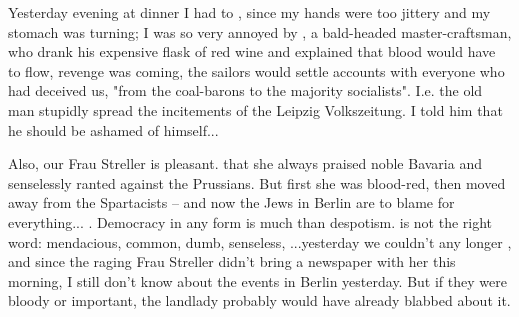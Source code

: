 
Yesterday evening at dinner I had to , since my hands were too jittery and my stomach was turning; I was so very annoyed by , a bald-headed master-craftsman, who drank his expensive flask of red wine and explained that blood would have to flow, revenge was coming, the sailors would settle accounts with everyone who had deceived us, "from the coal-barons to the majority socialists". I.e. the old man stupidly spread the incitements of the Leipzig Volkszeitung. I told him that he should be ashamed of himself...

Also, our Frau Streller is pleasant.  that she always praised noble Bavaria and senselessly ranted against the Prussians. But first she was blood-red, then moved away from the Spartacists -- and now the Jews in Berlin are to blame for everything... . Democracy in any form is much  than despotism.  is not the right word: mendacious, common, dumb, senseless, ...yesterday we couldn't any longer , and since the raging Frau Streller didn't bring a newspaper with her this morning, I still don't know about the events in Berlin yesterday. But if they were bloody or important, the landlady probably would have already blabbed about it.

\missing